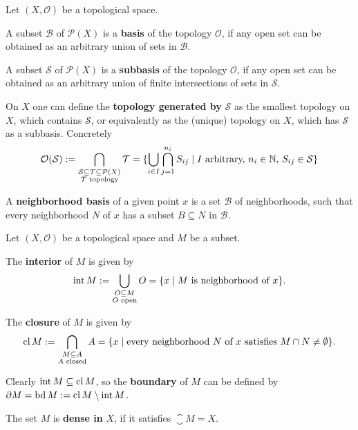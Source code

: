 \begin{definition}
	Let $(X, \mathcal{O})$ be a topological space. 

	A subset $\mathcal{B}$ of $\mathcal{P}(X)$ is a \textbf{basis} of the topology $\mathcal{O}$, if any open set can be obtained as an arbitrary union of sets in $\mathcal{B}$.

	A subset $\mathcal{S}$ of $\mathcal{P}(X)$ is a \textbf{subbasis} of the topology $\mathcal{O}$, if any open set can be obtained as an arbitrary union of finite intersections of sets in $\mathcal{S}$.

	On $X$ one can define the \textbf{topology generated by} $\mathcal{S}$ as the smallest topology on $X$, which contains $\mathcal{S}$, or equivalently as the (unique) topology on $X$, which has $\mathcal{S}$ as a subbasis. Concretely
	\begin{equation*}
		\mathcal{O}(\mathcal{S}) := \bigcap \limits_{\substack{\mathcal{S} \subseteq \mathcal{T} \subseteq \mathcal{P}(X)\\\mathcal{T} \text{ topology}}} \mathcal{T} = \{\bigcup \limits_{i \in I} \bigcap \limits_{j=1}^{n_i} S_{ij} \mid I \text{ arbitrary, } n_i \in \mathbb{N},\, S_{ij} \in \mathcal{S}\}
	\end{equation*}

	A \textbf{neighborhood basis} of a given point $x$ is a set $\mathcal{B}$ of neighborhoods, such that every neighborhood $N$ of $x$ has a subset $B \subseteq N$ in $\mathcal{B}$.
\end{definition}

\begin{definition}
	Let $(X, \mathcal{O})$ be a topological space and $M$ be a subset.

	The \textbf{interior} of $M$ is given by 
	\begin{equation*}
		\operatorname{int} M := \bigcup \limits_{\substack{O \subseteq M\\O \text{ open}}} O = \{x \mid M \text{ is neighborhood of } x\}.
	\end{equation*}

	The \textbf{closure} of $M$ is given by 
	\begin{equation*}
		\operatorname{cl} M := \bigcap \limits_{\substack{M \subseteq A\\A \text{ closed}}} A = \{x \mid \text{every neighborhood } N \text{ of } x \text{ satisfies } M \cap N \neq \emptyset\}.
	\end{equation*}

	Clearly $\operatorname{int} M \subseteq \operatorname{cl} M$, so the \textbf{boundary} of $M$ can be defined by $\partial M = \operatorname{bd} M := \operatorname{cl} M \setminus \operatorname{int} M$.

	The set $M$ is \textbf{dense in} $X$, if it satisfies $\closure M = X$.
\end{definition}

